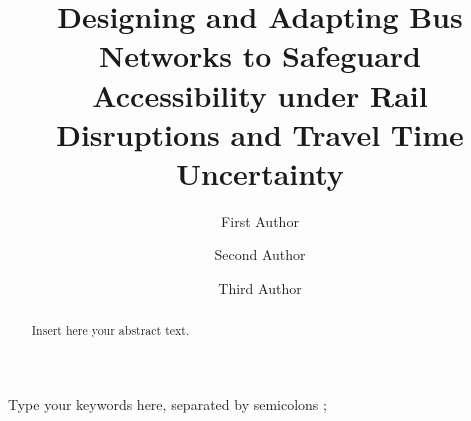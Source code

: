 \documentclass[3p,times,procedia]{elsarticle}
\begin{document}
\begin{frontmatter}



%

\title{Designing and Adapting Bus Networks to Safeguard Accessibility under Rail Disruptions and Travel Time Uncertainty}




\author[a]{First Author} 
\author[b]{Second Author}
\author[a,b]{Third Author}

\address[a]{First affiliation, Address, City and Postcode, Country}
\address[b]{Second affiliation, Address, City and Postcode, Country}

\begin{abstract}
Insert here your abstract text.
\end{abstract}

\begin{keyword}
Type your keywords here, separated by semicolons ; 





\end{keyword}
\end{frontmatter}
\end{document}
